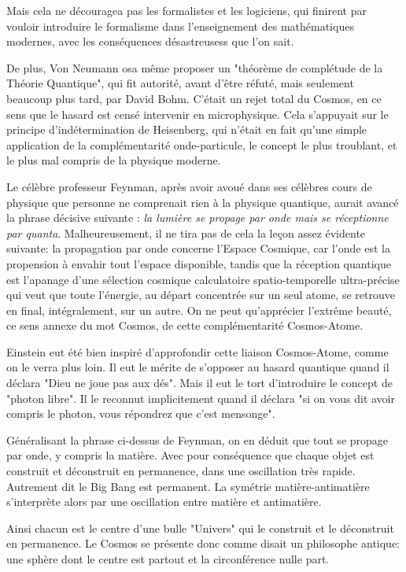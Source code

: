 \documentclass[a4paper,12pt]{article}
\begin{document}
Mais cela ne découragea pas les formalistes et les logiciens, qui finirent par vouloir introduire le formalisme dans l'enseignement des mathématiques modernes, avec les conséquences désastreusess que l'on sait. 

De plus, Von Neumann osa même proposer un "théorème de complétude de la Théorie Quantique", qui fit autorité, avant d'être réfuté, mais seulement beaucoup plus tard, par David Bohm. C'était un rejet total du Cosmos, en ce sens que le hasard est censé intervenir en microphysique. Cela s'appuyait sur le principe d'indétermination de Heisenberg, qui n'était en fait qu'une simple application de la complémentarité onde-particule, le concept le plus troublant, et le plus mal compris de la physique moderne.

Le célèbre professeur Feynman, après avoir avoué dans ses célèbres cours de physique que personne ne comprenait rien à la physique quantique, aurait avancé la phrase décisive suivante : \textit{la lumière se propage par onde mais se réceptionne par quanta}. Malheureusement, il ne tira pas de cela la leçon assez évidente suivante: la propagation par onde concerne l'Espace Cosmique, car l'onde est la propension à envahir tout l'espace disponible, tandis que la réception quantique est l'apanage d'une sélection cosmique calculatoire spatio-temporelle ultra-précise qui veut que toute l'énergie, au départ concentrée sur un seul atome, se retrouve en final, intégralement, sur un autre. On ne peut qu'apprécier l'extrême beauté, ce sens annexe du mot Cosmos, de cette complémentarité Cosmos-Atome. 

Einstein eut été bien inspiré d'approfondir cette liaison Cosmos-Atome, comme on le verra plus loin. Il eut le mérite de s'opposer au hasard quantique quand il déclara "Dieu ne joue pas aux dés". Mais il eut le tort d'introduire le concept de "photon libre". Il le reconnut implicitement quand il déclara "si on vous dit avoir compris le photon, vous répondrez que c'est mensonge".

Généralisant la phrase ci-dessus de Feynman, on en déduit que tout se propage par onde, y compris la matière. Avec pour conséquence que chaque objet est construit et déconstruit en permanence, dans une oscillation très rapide. Autrement dit le Big Bang est permanent. La symétrie matière-antimatière s'interprète alors par une oscillation entre matière et antimatière. 

Ainsi chacun est le centre d'une bulle "Univers" qui le construit et le déconstruit en permanence. Le Cosmos se présente donc comme disait un philosophe antique: une sphère dont le centre est partout et la circonférence nulle part.
\end{document}
